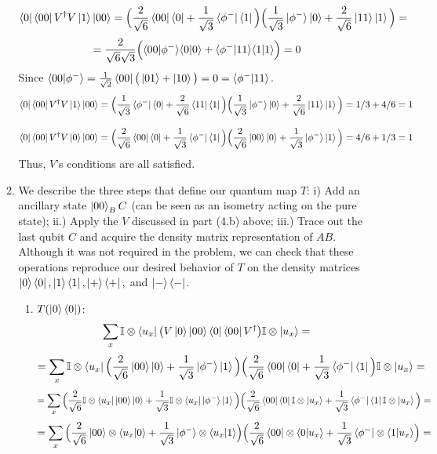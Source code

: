 \documentclass[12pt]{article}
\begin{document}
\begin{enumerate}
\begin{enumerate}
$$ \bra{0}\bra{00}V^\dagger V\ket{1}\ket{00} = \Big(
\frac{2}{\sqrt{6}} \bra{00}\bra{0} + \frac{1}{\sqrt{3}} \bra{\phi^-}\bra{1}\Big)
\Big(
\frac{1}{\sqrt{3}} \ket{\phi^-}\ket{0} + \frac{2}{\sqrt{6}} \ket{11}\ket{1}\Big) = $$
$$=
\frac{2}{\sqrt{6}\sqrt{3}}  \Big(
\langle 00 \vert \phi^-\rangle\langle 0 \vert 0\rangle + \langle \phi^- \vert 11\rangle\langle 1 \vert 1\rangle\Big) = 0$$
Since $\langle 00 \vert \phi^-\rangle = \frac{1}{\sqrt{2}}\bra{00} \big( \ket{01} + \ket{10}\big) = 0 =\langle \phi^- \vert 11\rangle$.
$$ \bra{0}\bra{00}V^\dagger V\ket{1}\ket{00} = \Big(
\frac{1}{\sqrt{3}} \bra{\phi^-}\bra{0} + \frac{2}{\sqrt{6}} \bra{11}\bra{1}\Big)
\Big(
\frac{1}{\sqrt{3}} \ket{\phi^-}\ket{0} + \frac{2}{\sqrt{6}} \ket{11}\ket{1}\Big) = 1/3 + 4/6 = 1$$

$$ \bra{0}\bra{00}V^\dagger V\ket{0}\ket{00} = \Big(
\frac{2}{\sqrt{6}} \bra{00}\bra{0} + \frac{1}{\sqrt{3}} \bra{\phi^-}\bra{1}\Big)
\Big(
\frac{2}{\sqrt{6}} \ket{00}\ket{0} + \frac{1}{\sqrt{3}} \ket{\phi^-}\ket{1}\Big) = 4/6 + 1/3 = 1 $$
Thus, $V$'s conditions are all satisfied.
\item 
We  describe the three steps that define our quantum map $T$: i) Add an ancillary state $\ket{00}_BC$ (can be seen as an isometry acting on the pure state); ii.) Apply the $V$ discussed in part (4.b) above; iii.) Trace out the last qubit $C$ and acquire the density matrix representation of $AB$. Although it was not required in the problem, we can check that these operations reproduce our desired behavior of $T$ on the density matrices $\ket{0}\bra{0}, \ket{1}\bra{1}, \ket{+}\bra{+},$ and $\ket{-}\bra{-}$. 
\begin{enumerate}
    \item $T(\ket{0}\bra{0})$:
$$ 
\sum_x \mathbb{I}\otimes \bra{u_x} \big(V \ket{0}\ket{00}\bra{0}\bra{00} V^\dagger \big)\mathbb{I}\otimes \ket{u_x} = $$
$$ = \sum_x \mathbb{I}\otimes \bra{u_x} 
\Big(
\frac{2}{\sqrt{6}} \ket{00}\ket{0} + \frac{1}{\sqrt{3}} \ket{\phi^-}\ket{1}\Big)
\Big(
\frac{2}{\sqrt{6}} \bra{00}\bra{0} + \frac{1}{\sqrt{3}} \bra{\phi^-}\bra{1}\Big)
\mathbb{I}\otimes \ket{u_x} =
$$
$$= \sum_x 
\Big(
\frac{2}{\sqrt{6}} \mathbb{I}\otimes \bra{u_x} \ket{00}\ket{0} + \frac{1}{\sqrt{3}} \mathbb{I}\otimes \bra{u_x} \ket{\phi^-}\ket{1}\Big)
\Big(
\frac{2}{\sqrt{6}} \bra{00}\bra{0} \mathbb{I}\otimes \ket{u_x} + \frac{1}{\sqrt{3}} \bra{\phi^-}\bra{1} \mathbb{I}\otimes \ket{u_x}\Big)
 =
$$
$$= \sum_x 
\Big(
\frac{2}{\sqrt{6}} \ket{00}\otimes\langle u_x \vert 0\rangle + \frac{1}{\sqrt{3}} \ket{\phi^-}\otimes \langle u_x \vert 1\rangle\Big)
\Big(
\frac{2}{\sqrt{6}} \bra{00}\otimes \langle 0 \vert u_x\rangle + \frac{1}{\sqrt{3}} \bra{\phi^-}\otimes \langle 1 \vert u_x\rangle\Big) = $$

\end{enumerate}
\end{enumerate}
\end{enumerate}
\end{document}
